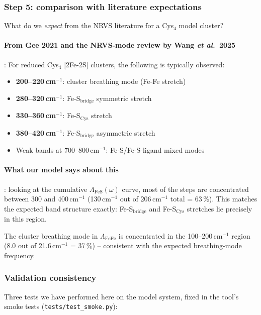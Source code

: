 \documentclass[11pt,a4paper,twoside]{article}
\theoremstyle{remark}
\begin{document}
\subsubsection*{Step 5: comparison with literature expectations}

What do we \emph{expect} from the NRVS literature for a Cys$_4$
model cluster?

\paragraph{From Gee 2021 \cite{Gee2021} and the NRVS-mode review
by Wang \emph{et al.}\ 2025 \cite{Wang2025}}:
For reduced Cys$_4$ [2Fe-2S] clusters, the following is typically
observed:
\begin{itemize}\setlength{\itemsep}{0pt}
  \item \textbf{200--220\,cm$^{-1}$}: cluster breathing mode
        (Fe-Fe stretch)
  \item \textbf{280--320\,cm$^{-1}$}: Fe-S$_\text{bridge}$
        symmetric stretch
  \item \textbf{330--360\,cm$^{-1}$}: Fe-S$_\text{Cys}$ stretch
  \item \textbf{380--420\,cm$^{-1}$}: Fe-S$_\text{bridge}$
        asymmetric stretch
  \item Weak bands at 700--800\,cm$^{-1}$:
        Fe-S/Fe-S-ligand mixed modes
\end{itemize}

\paragraph{What our model says about this}: looking at the
cumulative $\Lambda_\text{FeS}(\omega)$ curve, most of the steps
are concentrated between 300 and 400\,cm$^{-1}$ (130\,cm$^{-1}$
out of 206\,cm$^{-1}$ total = 63\,\%). This matches the expected
band structure exactly: Fe-S$_\text{bridge}$ and
Fe-S$_\text{Cys}$ stretches lie precisely in this region.

The cluster breathing mode in $\Lambda_\text{FeFe}$ is
concentrated in the 100--200\,cm$^{-1}$ region (8.0 out of
21.6\,cm$^{-1}$ = 37\,\%) -- consistent with the expected
breathing-mode frequency.

\subsubsection*{Validation consistency}

Three tests we have performed here on the model system, fixed in
the tool's smoke tests (\texttt{tests/test\_smoke.py}):
\end{document}
